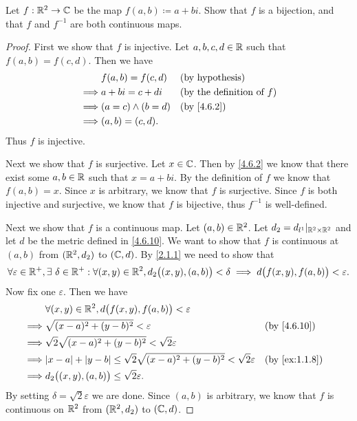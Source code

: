 \begin{ex}\label{ex:4.6.11}
  Let \(f : \mathbb{R}^2 \to \mathbb{C}\) be the map \(f(a, b) \coloneqq a + bi\).
  Show that \(f\) is a bijection, and that \(f\) and \(f^{-1}\) are both continuous maps.
\end{ex}

\begin{proof}
  First we show that \(f\) is injective.
  Let \(a, b, c, d \in \mathbb{R}\) such that \(f(a, b) = f(c, d)\).
  Then we have
  \begin{align*}
             & f(a, b) = f(c, d)     &  & \text{(by hypothesis)}              \\
    \implies & a + bi = c + di       &  & \text{(by the definition of \(f\))} \\
    \implies & (a = c) \land (b = d) &  & \by{4.6.2}                          \\
    \implies & (a, b) = (c, d).
  \end{align*}
  Thus \(f\) is injective.

  Next we show that \(f\) is surjective.
  Let \(x \in \mathbb{C}\).
  Then by \cref{4.6.2} we know that there exist some \(a, b \in \mathbb{R}\) such that \(x = a + bi\).
  By the definition of \(f\) we know that \(f(a, b) = x\).
  Since \(x\) is arbitrary, we know that \(f\) is surjective.
  Since \(f\) is both injective and surjective, we know that \(f\) is bijective, thus \(f^{-1}\) is well-defined.

  Next we show that \(f\) is a continuous map.
  Let \((a, b) \in \mathbb{R}^2\).
  Let \(d_2 = d_{l^1}|_{\mathbb{R}^2 \times \mathbb{R}^2}\) and let \(d\) be the metric defined in \cref{4.6.10}.
  We want to show that \(f\) is continuous at \((a, b)\) from \((\mathbb{R}^2, d_2)\) to \((\mathbb{C}, d)\).
  By \cref{2.1.1} we need to show that
  \[
    \forall \varepsilon \in \mathbb{R}^+, \exists\ \delta \in \mathbb{R}^+ : \forall (x, y) \in \mathbb{R}^2, d_2\big((x, y), (a, b)\big) < \delta \implies d\big(f(x, y), f(a, b)\big) < \varepsilon.
  \]
  Now fix one \(\varepsilon\).
  Then we have
  \begin{align*}
             & \forall (x, y) \in \R^2, d\big(f(x, y), f(a, b)\big) < \varepsilon                                                           \\
    \implies & \sqrt{(x - a)^2 + (y - b)^2} < \varepsilon                                                  &  & \text{(by \cref{4.6.10})}   \\
    \implies & \sqrt{2} \sqrt{(x - a)^2 + (y - b)^2} < \sqrt{2} \varepsilon                                                                 \\
    \implies & \abs{x - a} + \abs{y - b} \leq \sqrt{2} \sqrt{(x - a)^2 + (y - b)^2} < \sqrt{2} \varepsilon &  & \text{(by \cref{ex:1.1.8})} \\
    \implies & d_2\big((x, y), (a, b)\big) \leq \sqrt{2} \varepsilon.
  \end{align*}
  By setting \(\delta = \sqrt{2} \varepsilon\) we are done.
  Since \((a, b)\) is arbitrary, we know that \(f\) is continuous on \(\mathbb{R}^2\) from \((\mathbb{R}^2, d_2)\) to \((\mathbb{C}, d)\).


\end{proof}
